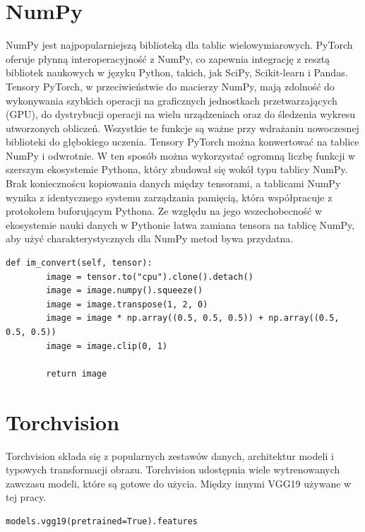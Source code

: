 \documentclass[openright]{xmgr}
\begin{document}
\section{NumPy\label{s:dsssl}}
    
  \indent \indent NumPy jest najpopularniejszą biblioteką dla tablic wielowymiarowych. PyTorch oferuje płynną interoperacyjność z NumPy, co zapewnia integrację z resztą bibliotek naukowych w języku Python, takich, jak SciPy, Scikit-learn i Pandas. Tensory PyTorch, w przeciwieństwie do macierzy NumPy, mają zdolność do wykonywania szybkich operacji na graficznych jednostkach przetwarzających (GPU), do dystrybucji operacji na wielu urządzeniach oraz do śledzenia wykresu utworzonych obliczeń. Wszystkie te funkcje są ważne przy wdrażaniu nowoczesnej biblioteki do głębokiego uczenia. Tensory PyTorch można konwertować na tablice NumPy i odwrotnie. W ten sposób można wykorzystać ogromną liczbę funkcji w szerszym ekosystemie Pythona, który zbudował się wokół typu tablicy NumPy. Brak koniecznoścu kopiowania danych między tensorami, a tablicami NumPy wynika z identycznego systemu zarządzania pamięcią, która współpracuje z protokołem buforującym Pythona. 
Ze względu na jego wszechobecność w ekosystemie nauki danych w Pythonie łatwa zamiana tensora na tablicę NumPy, aby użyć charakterystycznych dla NumPy metod bywa przydatna.

\begin{lstlisting}
def im_convert(self, tensor):
        image = tensor.to("cpu").clone().detach()
        image = image.numpy().squeeze()
        image = image.transpose(1, 2, 0)
        image = image * np.array((0.5, 0.5, 0.5)) + np.array((0.5, 0.5, 0.5))
        image = image.clip(0, 1)

        return image
\end{lstlisting}

    \section{Torchvision\label{s:dsssl}}
    
  \indent \indent Torchvision składa się z popularnych zestawów danych, architektur modeli i typowych transformacji obrazu. Torchvision udostępnia wiele wytrenowanych zawczasu modeli, które są gotowe do użycia. Między innymi VGG19 używane w tej pracy.
    
\begin{lstlisting}
models.vgg19(pretrained=True).features
\end{lstlisting}
\end{document}
